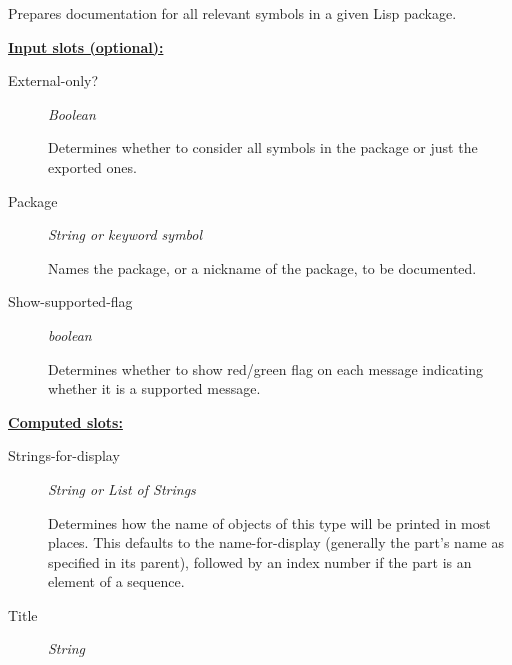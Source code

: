 \documentclass [11pt]{book}
\begin{document}
\begin{itemize}
\begin{description}
Prepares documentation for all relevant symbols in a given Lisp package.



\end{description}








\textbf{
\underline{Input slots (optional):}}

\begin{description}

\item [External-only?]
\emph{Boolean}

 Determines whether to consider all symbols in the package or just the exported ones.




\item [Package]
\emph{String or keyword symbol}

 Names the package, or a nickname of the package, to be documented.




\item [Show-supported-flag]
\emph{boolean}

 Determines whether to show red/green flag on each message indicating whether it is a
supported message.




\end{description}






\textbf{
\underline{Computed slots:}}

\begin{description}

\item [Strings-for-display]
\emph{String or List of Strings}

 Determines how the name of objects of this type will be printed in most places.
This defaults to the name-for-display (generally the part's name as specified in its
parent), followed by an index number if the part is an element of a sequence.




\item [Title]
\emph{String}


\end{description}
\end{itemize}
\end{document}
